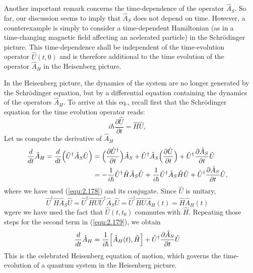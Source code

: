 Another important remark concerns the time-dependence of
 the operator $\hat{A}_S$. So far, our discussion seems to
 imply that $\hat{A}_S$ does not depend on time. However, a
 counterexample is simply to consider a time-dependent
 Hamiltonian (as in a time-changing magnetic field affecting
 an acelerated particle) in the Schrödinger picture. This
 time-dependence shall be independent of the time-evolution
 operator $\hat{U}(t,0)$ and is therefore additional to the
 time evolution of the operator $\hat{A}_H$ in the
 Heisenberg picture.

 In the Heisenberg picture, the dynamics of the system are
 no longer generated by the Schrödinger equation, but by a
 differential equation containing the dynamics of the
 operators $\hat{A}_H$. To arrive at this eq., recall first
 that the Schrödinger equation for the time evolution
 operator reads:
 \begin{equation}
   i\hbar \frac{\partial \hat{U}}{\partial t} =
   \hat{H}\hat{U},
   \label{equ:2.178}
 \end{equation}
 Let us compute the derivative of $\hat{A}_H$
 \begin{alignat}{2}
   \frac{d}{dt} \hat{A}_H = \frac{d}{dt}
   \Bigl(\hat{U}^{\dagger}\hat{A}_S \hat{U}\Bigr) &=
   \Bigl(\frac{\partial \hat{U}^{\dagger}}{\partial
   t}\Bigr) \hat{A}_S + \hat{U}^{\dagger}\hat{A}_S
   \Bigl(\frac{\partial \hat{U}}{\partial t}\Bigr) +
   \hat{U}^{\dagger} \frac{\partial \hat{A}_S}{\partial t}
   \hat{U} \nonumber\\
   &=
   - \frac{1}{i\hbar} \hat{U}^{\dagger}\hat{H}\hat{A}_S
   \hat{U} + \frac{1}{i\hbar} \hat{U}^{\dagger}\hat{A}_S
   \hat{H}\hat{U} + \hat{U}^{\dagger}\frac{\partial
   \hat{A}_S}{\partial t}\hat{U},
   \label{equ:2.179}
 \end{alignat}
 where we have used (\ref{equ:2.178}) and its conjugate.
 Since $\hat{U}$ is unitary,
 \begin{equation}
   \hat{U}^{\dagger}\hat{H}\hat{A}_S \hat{U} =
   \hat{U}^{\dagger} \hat{H} \hat{U} \hat{U}^{\dagger}
   \hat{A}_S \hat{U} =
   \hat{U}^{\dagger}\hat{H}\hat{U}\hat{A}_H(t) = \hat{H}
   \hat{A}_H(t)
   \label{equ:2.180}
 \end{equation}
 wgere we have used the fact that $\hat{U}(t,t_0)$ commutes
 with $\hat{H}$. Repeating those steps for the second term
 in (\ref{equ:2.179}), we obtain
 \begin{equation}
   \frac{d}{dt} \hat{A}_H = \frac{1}{i\hbar}
   \Bigl[\hat{A}_H(t), \hat{H}\Bigr] + \hat{U}^{\dagger}
   \frac{\partial \hat{A}_S}{\partial t} \hat{U}
   \label{equ:2.181}
 \end{equation}
 This is the celebrated Heisenberg equation of motion, which
 governs the time-evolution of a quantum system in the
 Heisenberg picture.
 
